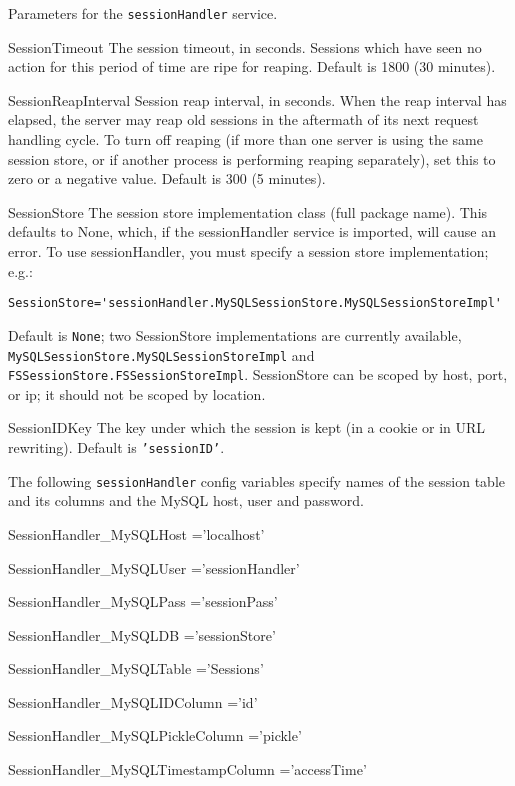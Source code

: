 \documentclass[titlepage]{manual}
\begin{document}
Parameters for the \texttt{sessionHandler} service.
\begin{argdesc}
\item[SessionTimeout] 
The session timeout, in seconds.  Sessions which have seen no action
for this period of time are ripe for reaping.
Default is 1800 (30 minutes).
\item[SessionReapInterval] \nonscope
Session reap interval, in seconds.  When the reap interval has elapsed,
the server may reap old sessions in the aftermath of its next
request handling cycle.  To turn off reaping (if more than one
server is using the same session store, or if another process
is performing reaping separately), set this to zero or a negative
value.
Default is 300 (5 minutes).
\item[SessionStore] 
The session store implementation class (full package name). This
defaults to None, which, if the sessionHandler service is imported,
will cause an error.  To use sessionHandler, you must specify a session
store implementation; e.g.:
\begin{verbatim} 
SessionStore='sessionHandler.MySQLSessionStore.MySQLSessionStoreImpl'
\end{verbatim}
Default is \texttt{None}; two SessionStore implementations are currently 
available, \texttt{MySQLSessionStore.MySQLSessionStoreImpl} and 
\texttt{FSSessionStore.FSSessionStoreImpl}.  SessionStore can be scoped 
by host, port, or ip; it should not be scoped by location.
\item[SessionIDKey] \nonscope
The key under which the session is kept (in a cookie or in URL rewriting).
Default is \texttt{'sessionID'}.
\end{argdesc}
The following \texttt{sessionHandler} config variables specify names
of the session table and its columns and the MySQL host, user and password.
\begin{argdesc}
\item[SessionHandler_MySQLHost]='localhost' \nonscope
\item[SessionHandler_MySQLUser]='sessionHandler' \nonscope
\item[SessionHandler_MySQLPass]='sessionPass' \nonscope
\item[SessionHandler_MySQLDB]='sessionStore' \nonscope
\item[SessionHandler_MySQLTable]='Sessions' \nonscope
\item[SessionHandler_MySQLIDColumn]='id' \nonscope
\item[SessionHandler_MySQLPickleColumn]='pickle' \nonscope
\item[SessionHandler_MySQLTimestampColumn]='accessTime' \nonscope
\end{argdesc}
\end{document}
